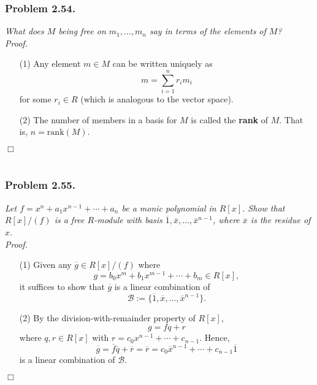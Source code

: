 \documentclass{article}
\begin{document}
\subsubsection*{Problem 2.54.}
\emph{What does $M$ being free on $m_1, \ldots, m_n$ say in terms of the elements of $M$?} \\



\emph{Proof.}
\begin{enumerate}
\item[(1)]
  Any element $m \in M$ can be written uniquely as
  \[
    m = \sum_{i=1}^{n} r_i m_i
  \]
  for some $r_i \in R$ (which is analogous to the vector space).

\item[(2)]
  The number of members in a basis for $M$ is called the \textbf{rank} of $M$.
  That is, $n = \mathrm{rank}(M)$.
\end{enumerate}
$\Box$ \\\\






\subsubsection*{Problem 2.55.}
\emph{Let $f = x^n + a_1 x^{n-1} + \cdots + a_n$ be a monic polynomial in $R[x]$.
Show that $R[x]/(f)$ is a free $R$-module with basis
$\overline{1}, \overline{x}, \ldots, \overline{x}^{n-1}$,
where $\overline{x}$ is the residue of $x$.} \\



\emph{Proof.}
\begin{enumerate}
\item[(1)]
  Given any $\overline{g} \in R[x]/(f)$
  where
  \[
    g = b_0 x^m + b_1 x^{m-1} + \cdots + b_m \in R[x],
  \]
  it suffices to show that
  $\overline{g}$ is a linear combination of
  \[
    \mathscr{B} := \{ \overline{1}, \overline{x}, \ldots, \overline{x}^{n-1} \}.
  \]

\item[(2)]
  By the division-with-remainder property of $R[x]$,
  \[
    g = fq + r
  \]
  where $q, r \in R[x]$ with $r = c_0 x^{n-1} + \cdots + c_{n-1}$.
  Hence,
  \[
    \overline{g}
    = \overline{f} \overline{q} + \overline{r}
    = \overline{r}
    = c_0 \overline{x}^{n-1} + \cdots + c_{n-1} \overline{1}
  \]
  is a linear combination of $\mathscr{B}$.
\end{enumerate}
$\Box$ \\\\
\end{document}
